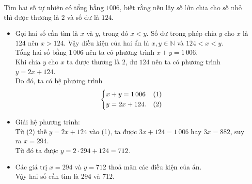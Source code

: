 \begin{vidu}
	Tìm hai số tự nhiên có tổng bằng $1006$, biết rằng nếu lấy số lớn chia cho số nhỏ thì được thương là $2$ và số dư là $124$.
	\doicot
	\begin{itemize}
		\item Gọi hai số cần tìm là $x$ và $y$, trong đó $x < y$. Số dư trong phép chia $y$ cho $x$ là $124$ nên $x > 124$. Vậy điều kiện của hai ẩn là $x, y \in \mathbb{N}$ và $124 < x < y$.\\
		Tổng hai số bằng $1\,006$ nên ta có phương trình $x + y = 1\,006$.\\
		Khi chia $y$ cho $x$ ta được thương là $2$, dư $124$ nên ta có phương trình $y = 2x + 124$.\\
		Do đó, ta có hệ phương trình 
		$$\left\{\begin{aligned}&x + y = 1\,006 & (1) \\& y = 2x + 124. & (2) \end{aligned}\right.$$
		\item Giải hệ phương trình: \\
		Từ (2) thế $y = 2x + 124$ vào (1), ta được $3x + 124 = 1\,006$ hay $3x = 882$, suy ra $x = 294$. \\
		Từ đó ta được $y = 2 \cdot 294 + 124 = 712$.
		\item Các giá trị $x = 294$ và $y = 712$ thoả mãn các điều kiện của ẩn. \\
		Vậy hai số cần tìm là $294$ và $712$.
	\end{itemize}
\end{vidu}

\tochucthuchien

